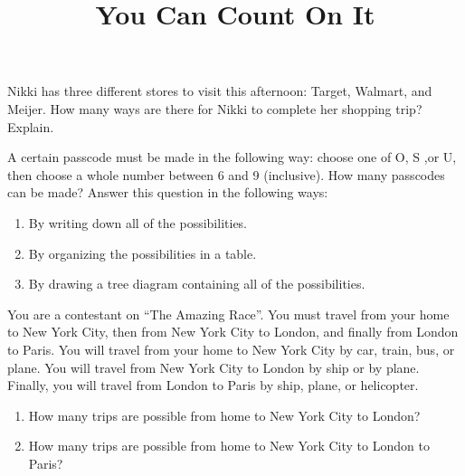 \documentclass[nooutcomes,noauthor, handout]{ximera}
\title{You Can Count On It}
\begin{document}
\begin{abstract}
\end{abstract}
\maketitle



\begin{problem}
Nikki has three different stores to visit this afternoon: Target, Walmart, and Meijer.  How many ways are there for Nikki to complete her shopping trip?  Explain.
\end{problem}





\begin{problem}
A certain passcode must be made in the following way: choose one of O, S ,or U, then choose a whole number between 6 and 9 (inclusive).  How many passcodes can be made?  Answer this question in the following ways:
\begin{enumerate}
\item By writing down all of the possibilities.
\item By organizing the possibilities in a table.
\item By drawing a tree diagram containing all of the possibilities.
\end{enumerate}
\end{problem}

\begin{problem}
You are a contestant on ``The Amazing Race''.  You must travel from your home to New York City, then from New York City to London, and finally from London to Paris.  You will travel from your home to New York City by car, train, bus, or plane.  You will travel from New York City to London by ship or by plane.  Finally, you will travel from London to Paris by ship, plane, or helicopter.
\begin{enumerate}
\item How many trips are possible from home to New York City to London?
\item How many trips are possible from home to New York City to London to Paris?
\end{enumerate}
\end{problem}
\end{document}
